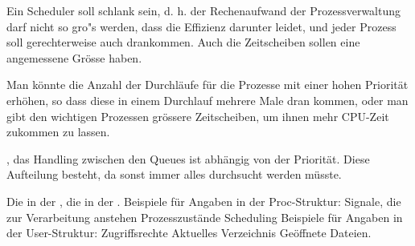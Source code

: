 \begin{answer}
  Ein Scheduler soll schlank  sein, d. h. der Rechenaufwand der Prozessverwaltung
  darf nicht so gro"s werden, dass die Effizienz darunter leidet, und jeder Prozess soll
  gerechterweise auch drankommen. Auch die Zeitscheiben sollen eine angemessene Grösse
  haben.
\end{answer}

\begin{answer}
  Man könnte die Anzahl der Durchläufe für die Prozesse mit einer hohen Priorität erhöhen,
  so dass diese in einem Durchlauf mehrere Male dran kommen, oder man gibt den wichtigen
  Prozessen grössere Zeitscheiben, um ihnen mehr CPU-Zeit zukommen zu lassen.
\end{answer}

\begin{answer}
  , das Handling zwischen den Queues ist abhängig von der Priorität. Diese
  Aufteilung besteht, da sonst immer alles durchsucht werden müsste.
\end{answer}

\begin{answer}
  Die in der ,
  die in der .
  Beispiele für Angaben in der Proc-Struktur:
  Signale, die zur Verarbeitung anstehen
  Prozesszustände
  Scheduling
  Beispiele für Angaben in der User-Struktur:
  Zugriffsrechte
  Aktuelles Verzeichnis
  Geöffnete Dateien.
\end{answer}

